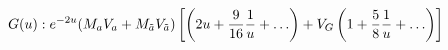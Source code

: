 \begin{equation}
G(u): e^{-2 u}  (M_a V_a+M_{\tilde{a}} V_{\tilde{a}}) \left[\left(2 u +\frac{9}{16} \frac{1}{u}+\ldots \right) +V_G \left(1+\frac{5}
{8} \frac{1}{u}%
+\ldots\right)\right] \\[2mm]
\end{equation}

